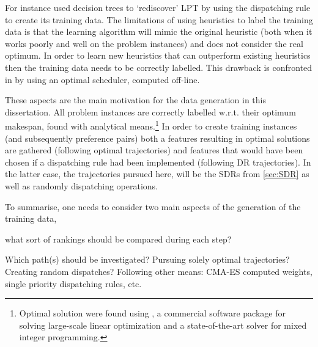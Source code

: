 For instance \cite{Siggi05} used decision trees to `rediscover' LPT by using the dispatching rule to create its training data. The limitations of using heuristics to label the training data is that the learning algorithm will mimic the original heuristic (both when it works poorly and well on the problem instances) and does not consider the real optimum. In order to learn new heuristics that can outperform existing heuristics then the training data needs to be correctly labelled. This drawback is confronted in \citep{Malik08,Russell09,Siggi10} by using an optimal scheduler, computed off-line. 

These aspects are the main motivation for the data generation in this dissertation. 
All problem instances are correctly labelled w.r.t. their optimum makespan, found with analytical means.\footnote{Optimal solution were found using \cite{gurobi}, a commercial software package for solving large-scale linear optimization and a state-of-the-art solver for mixed integer programming.} 
In order to create training instances (and subsequently preference pairs) both a features resulting in optimal solutions are gathered (following optimal trajectories) and features that would have been chosen if a dispatching rule had been implemented (following DR trajectories). 
In the latter case, the trajectories pursued here, will be the SDRs from \cref{sec:SDR} as well as randomly dispatching operations.

To summarise, one needs to consider two main aspects of the generation of the training data, 
\begin{inparaenum}[(a)]
\item what sort of rankings should be compared during each step? 
\item Which path(s) should be investigated? Pursuing solely optimal trajectories? Creating random dispatches? Following other means: CMA-ES computed weights, single priority dispatching rules, etc. 
\end{inparaenum}

